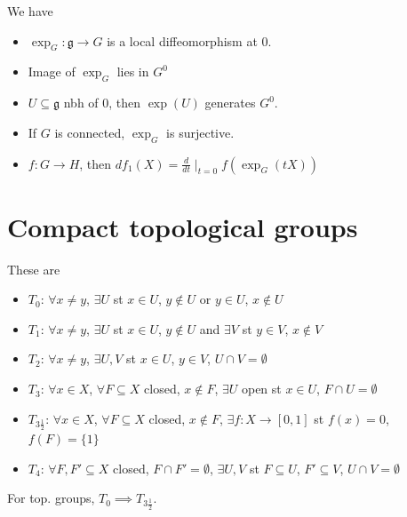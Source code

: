 \begin{proposition} We have
\begin{itemize}[topsep=-6pt, itemsep=0pt]
    \item $\exp_G: \mathfrak{g} \to G$ is a local diffeomorphism at $0$.
    \item Image of $\exp_G$ lies in $G^0$ 
    \item $U \subseteq \mathfrak{g}$ nbh of $0$, then $ \exp (U)$ generates $G^0$.
    \item If $G$ is connected, $\exp_G$ is surjective.
    \item $f : G \to H$, then $df_1(X) = \frac{d}{dt}\mid_{t=0} f(\exp_G(tX))$ 
\end{itemize}
\end{proposition}

\section{Compact topological groups}

\begin{definition} These are
\begin{itemize}[topsep=-6pt, itemsep=0pt]
    \item $T_0$: $\forall x \neq y$, $\exists U$ st $x \in U$, $y \notin U$ or $y \in U$, $x \notin U$
    \item $T_1$: $\forall x \neq y$, $\exists U$ st $x \in U$, $y \notin U$ and $\exists V$ st $y \in V$, $x \notin V$
    \item $T_2$: $\forall x \neq y$, $\exists U, V$ st $x \in U$, $y \in V$, $U \cap V = \emptyset$ 
    \item $T_3$: $\forall x \in X$, $\forall F \subseteq X$ closed, $x \notin F$, $\exists U$ open st $x \in U$, $F \cap U = \emptyset$
    \item $T_{3\frac{1}{2}}$: $\forall x \in X$, $\forall F \subseteq X$ closed, $x \notin F$, $\exists f : X \to [0, 1]$ st $f(x) = 0$, $f(F) = \{1\}$ 
    \item $T_4$: $\forall F, F' \subseteq X$ closed, $F \cap F' = \emptyset$, $\exists U, V$ st $F \subseteq U$, $F' \subseteq V$, $U \cap V = \emptyset$   
\end{itemize}
\end{definition}

\begin{proposition} For top. groups, $T_0 \implies T_{3 \frac{1}{2}}$.
\end{proposition}

